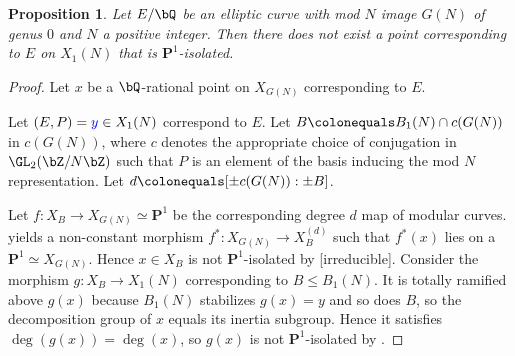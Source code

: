 \documentclass[11pt,reqno]{amsart}
\theoremstyle{plain}
\newtheorem{proposition}[theorem]{Proposition}
\theoremstyle{definition}
\newcommand{\Q}{\bQ}
\newcommand{\Z}{\bZ}
\newcommand{\PP}{\mathbf P}
\newcommand{\filip}[1]{{\textcolor{cyan}{Filip: [#1]}}}
\newcommand{\abbey}[1]{\textcolor{blue}{Abbey: #1}}
\newcommand{\timo}[1]{\textcolor{red}{Timo: #1}}
\newcommand{\abedit}[1]{{\color{blue} #1}}
\begin{document}
\begin{proposition} \label{Genus0Prop}
Let $E/\Q$ be an elliptic curve with mod $N$ image $G(N)$ of genus $0$ and $N$ a positive integer. Then there does not exist a point corresponding to $E$ on $X_1(N)$ that is $\PP^1$-isolated.
\end{proposition}
\begin{proof}
Let $x$ be a $\Q$-rational point on $X_{G(N)}$ corresponding to $E$.


Let $(E,P)=\abedit{y} \in X_1(N)$ correspond to $E$. Let $B \colonequals B_1(N) \cap c(G(N))$ in $c(G(N))$, where $c$ denotes the appropriate choice of conjugation in $\GL_2(\Z/N\Z)$ such that $P$ is an element of the basis inducing the mod $N$ representation. Let $d \colonequals [\pm c(G(N)) : \pm B]$. %

Let $f\colon X_{B}\rightarrow X_{G(N)} \simeq \PP^1$ be the corresponding degree $d$ map of modular curves. %
 yields a non-constant morphism $f^*\colon X_{G(N)} \to X_{B}^{(d)}$ such that $f^*(x)$ lies on a $\PP^1 \simeq X_{G(N)}$.
Hence $x \in X_B$ is not $\PP^1$-isolated by  [irreducible]. Consider the morphism $g\colon X_B \to X_1(N)$ corresponding to $B \leq B_1(N)$. It is totally ramified above $g(x)$ because $B_1(N)$ stabilizes $g(x) = y$ and so does $B$, so the decomposition group of $x$ equals its inertia subgroup. Hence it satisfies $\deg(g(x)) = \deg(x)$, so $g(x)$ is not $\PP^1$-isolated by .
\end{proof}
\end{document}
